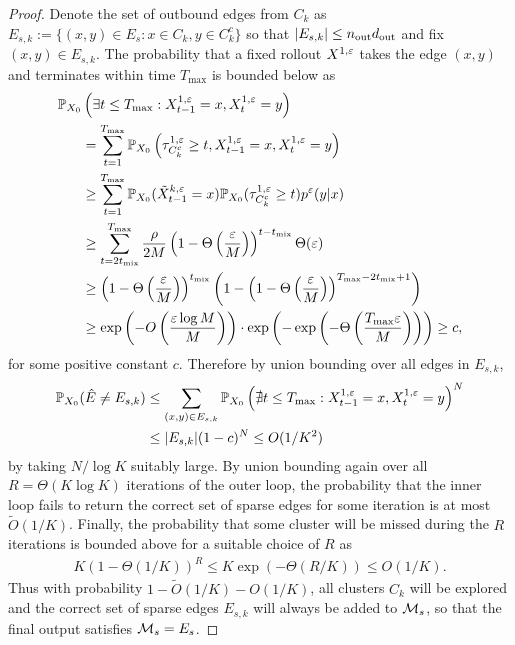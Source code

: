 \begin{proof}
Denote the set of outbound edges from $C_k$ as $E_{s,k} :=\{(x,y)\in E_s: x\in C_k,y\in C_k^c\}$ so that $|E_{s,k}|\le n_{\operatorname{out}}d_{\operatorname{out}}$ and fix $(x,y)\in E_{s,k}$. The probability that a fixed rollout $X^{1,\varepsilon}$ takes the edge $(x,y)$ and terminates within time $T_{\max}$ is bounded below as
\begin{align*}
\mathbb{P}_{X_0}&\left(\exists t\le T_{\max}: X_{t-1}^{1,\varepsilon} = x, X_t^{1,\varepsilon} = y\right)\\
&= \sum_{t=1}^{T_{\max}} \mathbb{P}_{X_0}\left(\tau_{C_k^c}^{1,\varepsilon}\ge t, X_{t-1}^{1,\varepsilon}=x, X_t^{1,\varepsilon}=y\right) \\
&\ge \sum_{t=1}^{T_{\max}} \mathbb{P}_{X_0}(\tilde{X}_{t-1}^{k,\varepsilon} =x) \mathbb{P}_{X_0}(\tau_{C_k^c}^{1,\varepsilon}\ge t) p^\varepsilon(y|x)\\
&\ge \sum_{t=2t_{\operatorname{mix}}}^{T_{\max}} \frac{\rho}{2M} \left(1-\Theta\left(\frac{\varepsilon}{M}\right)\right)^{t-t_{\operatorname{mix}}} \Theta(\varepsilon) \\
&\ge \left(1-\Theta\left(\frac{\varepsilon}{M}\right)\right)^{t_{\operatorname{mix}}} \left(1- \left(1-\Theta\left(\frac{\varepsilon}{M}\right)\right)^{T_{\max}-2t_{\operatorname{mix}}+1}\right) \\
&\ge \exp\left(-O\left(\frac{\varepsilon\log M}{M}\right)\right) \cdot\exp\left(-\exp\left(-\Theta\left(\frac{T_{\max}\varepsilon}{M} \right)\right)\right) \ge c,
\end{align*}
for some positive constant $c$. Therefore by union bounding over all edges in $E_{s,k}$,
\begin{align*}
\mathbb{P}_{X_0}(\hat{E}\ne E_{s,k}) &\le \sum_{(x,y)\in E_{s,k}}\mathbb{P}_{X_0}\left(\nexists t\le T_{\max}: X_{t-1}^{1,\varepsilon} = x, X_t^{1,\varepsilon} = y\right)^N\\
&\le |E_{s,k}|(1-c)^N \le O(1/K^2)
\end{align*}
by taking $N/\log K$ suitably large. By union bounding again over all $R=\Theta(K\log K)$ iterations of the outer loop, the probability that the inner loop fails to return the correct set of sparse edges for some iteration is at most $\widetilde{O}(1/K)$. Finally, the probability that some cluster will be missed during the $R$ iterations is bounded above for a suitable choice of $R$ as
\begin{align*}
K\left(1-\Theta(1/K)\right)^R \le K\exp\left(-\Theta(R/K)\right) \le O(1/K).
\end{align*}
Thus with probability $1-\widetilde{O}(1/K)-O(1/K)$, all clusters $C_k$ will be explored and the correct set of sparse edges $E_{s,k}$ will always be added to $\mathcal{M}_s$, so that the final output satisfies $\mathcal{M}_s=E_s$.
\end{proof}


